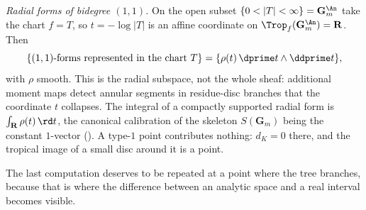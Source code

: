 \begin{example}
\emph{Radial forms of bidegree $(1,1)$.} On the open subset
$\{0<|T|<\infty\}=\mathbf G_{m}^{\An}$ take the chart $f=T$, so
$t=-\log|T|$ is an affine coordinate on $\Trop_f(\mathbf G_m^{\An})
=\mathbf R$.  Then
\[
 \{\text{$(1,1)$-forms represented in the chart $T$}\}
 =\{\rho(t)\,\dprime t\wedge\ddprime t\},
\]
with $\rho$ smooth.  This is the radial subspace, not the whole sheaf:
additional moment maps detect annular segments in residue-disc branches that
the coordinate $t$ collapses.  The integral of a compactly supported radial
form is $\int_{\mathbf R}\rho(t)\,\rd t$, the canonical calibration of the skeleton
$S(\mathbf G_m)$ being the constant $1$-vector
().  A type-$1$ point contributes nothing:
$d_K=0$ there, and the tropical image of a small disc around it is a point.
\end{example}

The last computation deserves to be repeated at a point where the tree
branches, because that is where the difference between an analytic space and
a real interval becomes visible.

